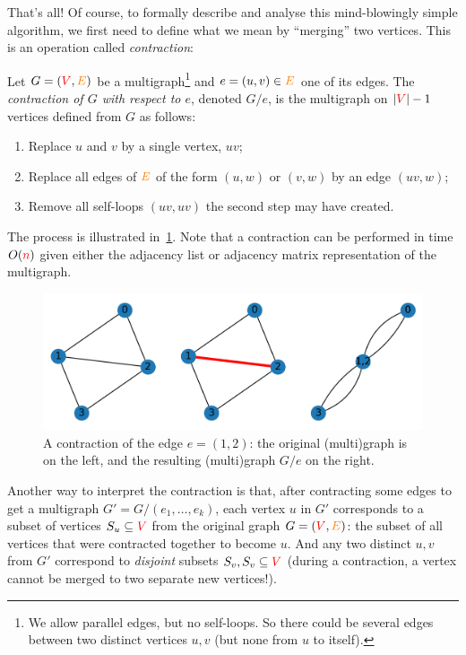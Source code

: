That's all! Of course, to formally describe and analyse this mind-blowingly simple algorithm, we first need to define what we mean by ``merging'' two vertices. This is an operation called \emph{contraction}:
\begin{definition}
    Let $G=(\textcolor{red}{V},\textcolor{orange}{E})$ be a multigraph\footnote{We allow parallel edges, but no self-loops. So there could be several edges between two distinct vertices $u,v$ (but none from $u$ to itself).} and $e=(u,v)\in\textcolor{orange}{E}$ one of its edges. The \emph{contraction of $G$ with respect to $e$}, denoted $G/e$, is the multigraph on $\left\lvert \textcolor{red}{V} \right\rvert-1$ vertices defined from $G$ as follows:
    \begin{enumerate}
        \item Replace $u$ and $v$ by a single vertex, $uv$;
        \item Replace all edges of $\textcolor{orange}{E}$ of the form $(u,w)$ or $(v,w)$ by an edge $(uv,w)$;
        \item Remove all self-loops $(uv, uv)$ the second step may have created.
    \end{enumerate}
\end{definition}
The process is illustrated in~\cref{fig:karger:contraction}. Note that a contraction can be performed in time $O(\textcolor{red}{n})$ given either the adjacency list or adjacency matrix representation of the multigraph.
\begin{figure}[htbp]
    \centering
    \includegraphics[width=1.0\textwidth]{figures/fig-karger-contraction.png}
    \caption{A contraction of the edge $e=(1,2)$: the original (multi)graph is on the left, and the resulting (multi)graph $G/e$ on the right.}
    \label{fig:karger:contraction}
\end{figure}

Another way to interpret the contraction is that, after contracting some edges to get a multigraph $G'=G/(e_1,\dots, e_k)$, each vertex $u$ in $G'$ corresponds to a subset of vertices $S_u\subseteq \textcolor{red}{V}$ from the original graph $G=(\textcolor{red}{V}, \textcolor{orange}{E})$: the subset of all vertices that were contracted together to become $u$. And any two distinct $u,v$ from $G'$ correspond to \emph{disjoint} subsets $S_v,S_v\subseteq \textcolor{red}{V}$ (during a contraction, a vertex cannot be merged to two separate new vertices!). 


